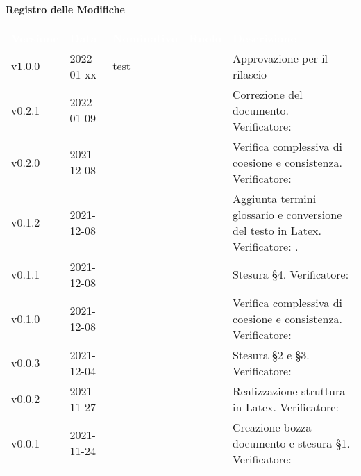 
{\LARGE{\textbf{Registro delle Modifiche}}} \\
\renewcommand{\arraystretch}{1.5}
\begin{longtable}{ m{}<{\centering}  m{}<{\centering}  m{}<{\centering}  m{}<{\centering}  m{}<{\centering} }
	\rowcolor{darkblue}
	\textcolor{white}{\textbf{Versione}} &\textcolor{white}{\textbf{Data}}& \textcolor{white}{\textbf{Nominativo}} & \textcolor{white}{\textbf{Ruolo}}& \textcolor{white}{\textbf{Descrizione}} \\ 	
	v1.0.0& 2022-01-xx & test & \RE{}  & Approvazione per il rilascio\\
	
	v0.2.1& 2022-01-09 &  \MB{} & \AM{}  & Correzione del documento. Verificatore: \textit{\FP}\\

	v0.2.0& 2021-12-08 & \MB{} & \VE{}  & Verifica complessiva di coesione e consistenza. Verificatore: \textit{\FP}\\	
	
	v0.1.2& 2021-12-08 &  \EP{} & \RE{} & Aggiunta termini glossario e conversione del testo in Latex. Verificatore: \textit{\FP}.\\
	
	v0.1.1& 2021-12-08 & \MB{} & \AM{} & Stesura §4. Verificatore: \textit{\FP}\\

	v0.1.0& 2021-12-08 &  \EP{} & \VE{} & Verifica complessiva di coesione e consistenza. Verificatore: \textit{\FP} \\	

	v0.0.3& 2021-12-04 &  \MB{} & \AM{} & Stesura §2 e §3. Verificatore: \textit{\FP} \\

	v0.0.2& 2021-11-27 &  \EP{} & \AM{}  & Realizzazione struttura in Latex. Verificatore: \textit{\FP}\\

	v0.0.1& 2021-11-24 &  \MB{} & \RE{} & Creazione bozza documento e stesura §1. Verificatore: \textit{\FP} \\

\end{longtable}

\pagebreak
